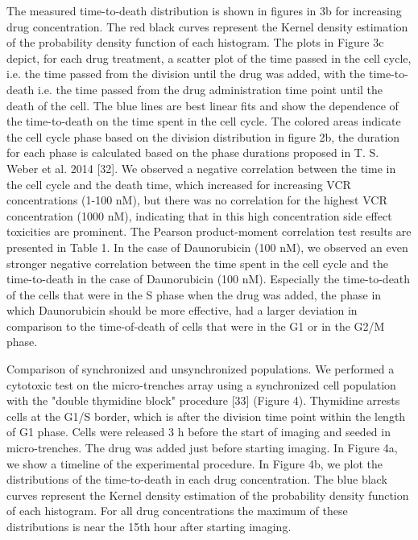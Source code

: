 \documentclass[pdftex,12pt,a4paper]{report}
\begin{document}
The measured time-to-death distribution is shown in figures in 3b for increasing drug concentration. The red black curves represent the Kernel density estimation of the probability density function of each histogram. The plots in Figure 3c depict, for each drug treatment, a scatter plot of the time passed in the cell cycle, i.e. the time passed from the division until the drug was added, with the time-to-death i.e. the time passed from the drug administration time point until the death of the cell. The blue lines are best linear fits and show the dependence of the time-to-death on the time spent in the cell cycle. The colored areas indicate the cell cycle phase based on the division distribution in figure 2b, the duration for each phase is calculated based on the phase durations proposed in T. S. Weber et al. 2014 [32]. We observed a negative correlation between the time in the cell cycle and the death time, which increased for increasing VCR concentrations (1-100 nM), but there was no correlation for the highest VCR concentration (1000 nM), indicating that in this high concentration side effect toxicities are prominent. The Pearson product-moment correlation test results are presented in Table 1. In the case of Daunorubicin (100 nM), we observed an even stronger negative correlation between the time spent in the cell cycle and the time-to-death in the case of Daunorubicin (100 nM). Especially the time-to-death of the cells that were in the S phase when the drug was added, the phase in which Daunorubicin should be more effective, had a larger deviation in comparison to the time-of-death of cells that were in the G1 or in the G2/M phase. 

Comparison of synchronized and unsynchronized populations. We performed a cytotoxic test on the micro-trenches array using a synchronized cell population with the "double thymidine block" procedure [33] (Figure 4). Thymidine arrests cells at the G1/S border, which is after the division time point within the length of G1 phase. Cells were released 3 h before the start of imaging and seeded in micro-trenches. The drug was added just before starting imaging. In Figure 4a, we show a timeline of the experimental procedure. In Figure 4b, we plot the distributions of the time-to-death in each drug concentration. The blue black curves represent the Kernel density estimation of the probability density function of each histogram. For all drug concentrations the maximum of these distributions is near the 15th hour after starting imaging.
\end{document}
